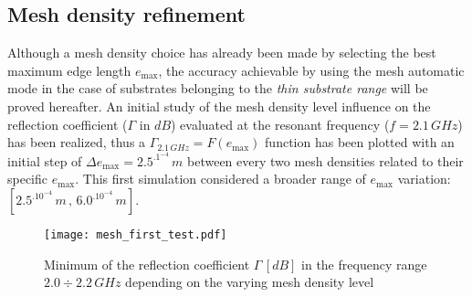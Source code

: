 \documentclass[12pt,a4paper]{article}
\begin{document}
{\subsection*{Mesh density refinement}
Although a mesh density choice has already been made by selecting the best maximum edge length $e_{\max}$, the accuracy achievable by using the mesh automatic mode in the case of substrates belonging to the  \emph{thin substrate range} will be proved hereafter. An initial study of the mesh density level influence on the reflection coefficient ($\Gamma$ in $dB$) evaluated at the resonant frequency ($f=2.1\,GHz$) has been realized, thus a  $\Gamma_{2.1\,GHz}=F(e_{\max})$ function has been plotted with an initial step of $\Delta e_{\max} = 2.5^.1^{-4}\,m$ between every two mesh densities related to their specific $e_{\max}$. This first simulation considered a broader range of $e_{\max}$ variation: $[2.5^.10^{-4}\,m\,,\,6.0^.10^{-4}\,m]$. 
\begin{figure}[h]
\begin{center}

		\texttt{[image: mesh\_first\_test.pdf]}
		\caption{{Minimum of the reflection coefficient $\Gamma\, [dB]$ in the frequency range $2.0\div 2.2\,GHz$ depending on the varying mesh density level}}
		\label{fig:mesh_first_test}
\end{center}

	\end{figure}

}
\end{document}
